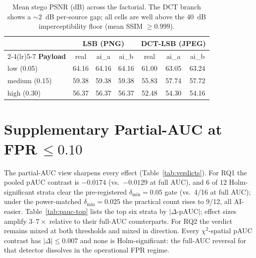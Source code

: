 \documentclass[10pt,twocolumn,a4paper]{article}
\begin{document}
\begin{table}[!htbp]
\centering\small
\caption{Mean stego PSNR (dB) across the factorial. The DCT branch shows a $\sim\!2$~dB per-source gap; all cells are well above the 40~dB imperceptibility floor (mean SSIM $\geq\!0.999$).}
\label{tab:quality}
\setlength{\tabcolsep}{5pt}\renewcommand{\arraystretch}{1.1}
\begin{tabular}{@{}l c c c c c c@{}}
\toprule
& \multicolumn{3}{c}{\textbf{LSB (PNG)}} & \multicolumn{3}{c}{\textbf{DCT-LSB (JPEG)}} \\
\cmidrule(lr){2-4}\cmidrule(lr){5-7}
\textbf{Payload} & real & ai\_a & ai\_b & real & ai\_a & ai\_b \\
\midrule
low (0.05)    & 64.16 & 64.16 & 64.16 & 61.00 & 63.05 & 63.24 \\
medium (0.15) & 59.38 & 59.38 & 59.38 & 55.83 & 57.74 & 57.72 \\
high (0.30)   & 56.37 & 56.37 & 56.37 & 52.48 & 54.30 & 54.16 \\
\bottomrule
\end{tabular}
\end{table}

\section{Supplementary Partial-AUC at FPR\,$\leq\!0.10$}
\label{app:pauc}
The partial-AUC view sharpens every effect (Table~\ref{tab:verdicts}). For RQ1 the pooled pAUC contrast is $-0.0174$ (vs.\ $-0.0129$ at full AUC), and 6 of 12 Holm-significant strata clear the pre-registered $\delta_\text{min}\!=\!0.05$ gate (vs.\ 4/16 at full AUC); under the power-matched $\delta_\text{min}\!=\!0.025$ the practical count rises to 9/12, all AI-easier. Table~\ref{tab:pauc-top} lists the top six strata by $|\Delta\text{-pAUC}|$; effect sizes amplify $3$--$7\times$ relative to their full-AUC counterparts. For RQ2 the verdict remains mixed at both thresholds and mixed in direction. Every $\chi^2$-spatial pAUC contrast has $|\Delta|\!\leq\!0.007$ and none is Holm-significant: the full-AUC reversal for that detector dissolves in the operational FPR regime.
\end{document}
